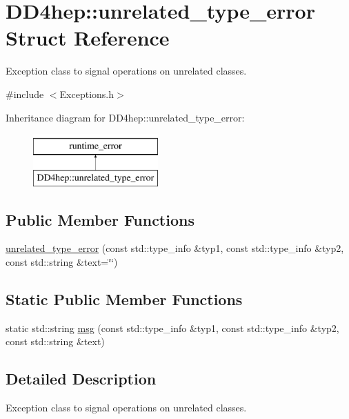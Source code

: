 \hypertarget{struct_d_d4hep_1_1unrelated__type__error}{}\section{D\+D4hep\+:\+:unrelated\+\_\+type\+\_\+error Struct Reference}
\label{struct_d_d4hep_1_1unrelated__type__error}


Exception class to signal operations on unrelated classes.  




{\ttfamily \#include $<$Exceptions.\+h$>$}

Inheritance diagram for D\+D4hep\+:\+:unrelated\+\_\+type\+\_\+error\+:\begin{figure}[H]
\begin{center}
\leavevmode
\includegraphics[height=2.000000cm]{struct_d_d4hep_1_1unrelated__type__error}
\end{center}
\end{figure}
\subsection*{Public Member Functions}
\begin{DoxyCompactItemize}
\item 
\hyperlink{struct_d_d4hep_1_1unrelated__type__error_a53f8227fa75c1552d30b3d43e104a2ba}{unrelated\+\_\+type\+\_\+error} (const std\+::type\+\_\+info \&typ1, const std\+::type\+\_\+info \&typ2, const std\+::string \&text=\char`\"{}\char`\"{})
\end{DoxyCompactItemize}
\subsection*{Static Public Member Functions}
\begin{DoxyCompactItemize}
\item 
static std\+::string \hyperlink{struct_d_d4hep_1_1unrelated__type__error_ab9b27edef2998895e04ccda3a241da29}{msg} (const std\+::type\+\_\+info \&typ1, const std\+::type\+\_\+info \&typ2, const std\+::string \&text)
\end{DoxyCompactItemize}


\subsection{Detailed Description}
Exception class to signal operations on unrelated classes. 

